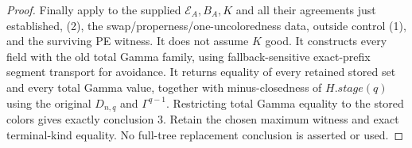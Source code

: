 \begin{proof}
Finally apply  to the supplied
$\mathcal E_A,B_A,K$ and all their agreements just established, (2),
the swap/properness/one-uncoloredness data, outside control (1), and
the surviving PE witness.
It does not assume $K$ good.  It constructs every
 field with the old total Gamma family, using
fallback-sensitive exact-prefix segment transport for avoidance.
It returns equality of every retained stored set and every total Gamma
value, together with minus-closedness of $H.\mathit{stage}(q)$ using
the original $D_{n,q}$ and $\Gamma^{q-1}$.
Restricting total Gamma equality to the stored colors gives exactly
conclusion 3.  Retain the chosen maximum witness and exact terminal-kind
equality.  No full-tree replacement conclusion is asserted or used.
\end{proof}
